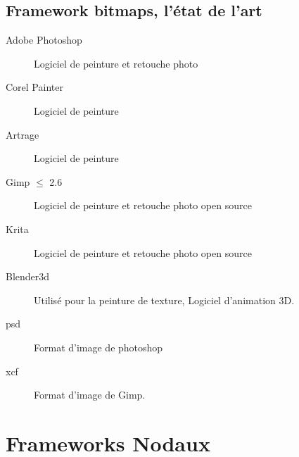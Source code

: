 		\subsection{Framework bitmaps, l'état de l'art}
			\begin{description}
				\item[Adobe Photoshop] Logiciel de peinture et retouche photo
				\item[Corel Painter] Logiciel de peinture
				\item[Artrage] Logiciel de peinture
				\item[Gimp $\leq$ 2.6] Logiciel de peinture et retouche photo open source
				\item[Krita] Logiciel de peinture et retouche photo open source
				\item[Blender3d] Utilisé pour la peinture de texture, Logiciel d'animation 3D.
				\item[psd] Format d'image de photoshop
				\item[xcf] Format d'image de Gimp.
			\end{description}

	\section{Frameworks Nodaux}

